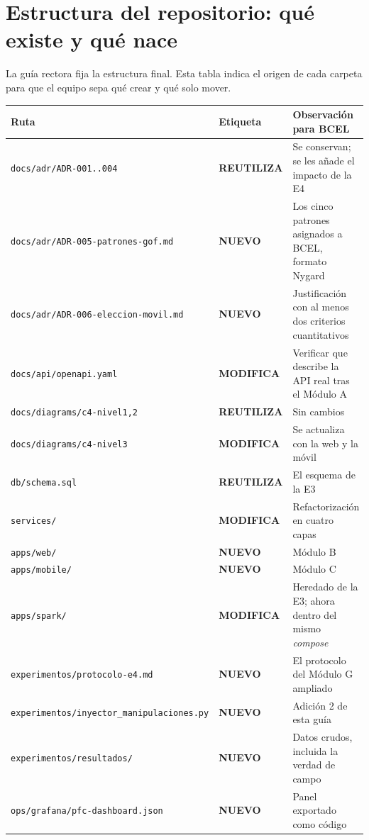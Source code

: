 \documentclass[11pt,a4paper]{article}
\newcommand{\reuso}{\cellcolor{filaReuso}\textbf{REUTILIZA}}
\newcommand{\cambia}{\cellcolor{filaCambia}\textbf{MODIFICA}}
\newcommand{\nuevo}{\cellcolor{filaNuevo}\textbf{NUEVO}}
\begin{document}
\section{Estructura del repositorio: qué existe y qué nace}

La guía rectora fija la estructura final. Esta tabla indica el origen de cada carpeta para que el equipo sepa qué crear y qué solo mover.

\begin{center}
	\footnotesize
	\begin{longtable}{@{}p{5.4cm}p{1.9cm}p{7.5cm}@{}}
		\toprule
		\textbf{Ruta} & \textbf{Etiqueta} & \textbf{Observación para BCEL} \\
		\midrule
		\endhead
		\texttt{docs/adr/ADR-001..004} & \reuso & Se conservan; se les añade el impacto de la E4 \\
		\texttt{docs/adr/ADR-005-\allowbreak patrones-gof.md} & \nuevo & Los cinco patrones asignados a BCEL, formato Nygard \\
		\texttt{docs/adr/ADR-006-\allowbreak eleccion-movil.md} & \nuevo & Justificación con al menos dos criterios cuantitativos \\
		\texttt{docs/api/openapi.yaml} & \cambia & Verificar que describe la API real tras el Módulo A \\
		\texttt{docs/diagrams/c4-nivel1,2} & \reuso & Sin cambios \\
		\texttt{docs/diagrams/c4-nivel3} & \cambia & Se actualiza con la web y la móvil \\
		\texttt{db/schema.sql} & \reuso & El esquema de la E3 \\
		\texttt{services/} & \cambia & Refactorización en cuatro capas \\
		\texttt{apps/web/} & \nuevo & Módulo B \\
		\texttt{apps/mobile/} & \nuevo & Módulo C \\
		\texttt{apps/spark/} & \cambia & Heredado de la E3; ahora dentro del mismo \emph{compose} \\
		\texttt{experimentos/\allowbreak protocolo-e4.md} & \nuevo & El protocolo del Módulo G ampliado \\
		\texttt{experimentos/\allowbreak inyector\_manipulaciones.py} & \nuevo & Adición 2 de esta guía \\
		\texttt{experimentos/resultados/} & \nuevo & Datos crudos, incluida la verdad de campo \\
		\texttt{ops/grafana/\allowbreak pfc-dashboard.json} & \nuevo & Panel exportado como código \\

\end{longtable}
\end{center}
\end{document}
